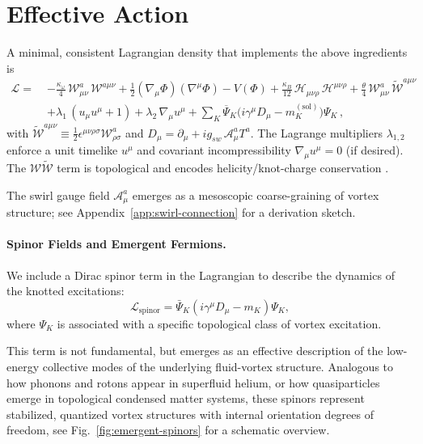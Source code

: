 \documentclass[12pt]{article}
\begin{document}
    \section{Effective Action}

    A minimal, consistent Lagrangian density that implements the above ingredients is
    \begin{align}
        \mathcal{L} =\;& -\frac{\kappa_\omega}{4}\, \mathcal{W}^a_{\mu\nu}\,\mathcal{W}^{a\mu\nu}
        + \frac{1}{2} (\nabla_\mu \Phi)(\nabla^\mu \Phi) - V(\Phi)
        + \frac{\kappa_B}{12}\, \mathcal{H}_{\mu\nu\rho}\,\mathcal{H}^{\mu\nu\rho}
        + \frac{\theta}{4}\, \mathcal{W}^a_{\mu\nu}\,\tilde{\mathcal{W}}^{a\mu\nu} \\
        &+ \lambda_1\,(u_\mu u^\mu + 1) + \lambda_2\, \nabla_\mu u^\mu
        + \sum_K \overline{\Psi}_K\big(i\gamma^\mu D_\mu - m_K^{(\mathrm{sol})}\big)\Psi_K\,,
        \label{eq:EFT}
    \end{align}
    with $\tilde{\mathcal{W}}^{a\mu\nu} \equiv \tfrac{1}{2} \epsilon^{\mu\nu\rho\sigma} \mathcal{W}^a_{\rho\sigma}$ and $D_\mu = \partial_\mu + i g_{\!sw}\,\mathcal{A}_\mu^a T^a$. The Lagrange multipliers $\lambda_{1,2}$ enforce a unit timelike $u^\mu$ and covariant incompressibility $\nabla_\mu u^\mu=0$ (if desired). The $\mathcal{W}\tilde{\mathcal{W}}$ term is topological and encodes helicity/knot-charge conservation \cite{Moffatt1969,Arnold1998}.

    The swirl gauge field \( \mathcal{A}_\mu^a \) emerges as a mesoscopic coarse-graining of vortex structure; see Appendix~\ref{app:swirl-connection} for a derivation sketch.

    \paragraph{Spinor Fields and Emergent Fermions.}
    We include a Dirac spinor term in the Lagrangian to describe the dynamics of the knotted excitations:
    \begin{equation}
        \mathcal{L}_\text{spinor} = \bar{\Psi}_K \left( i\gamma^\mu D_\mu - m_K \right) \Psi_K,
    \end{equation}
    where $\Psi_K$ is associated with a specific topological class of vortex excitation.

    This term is not fundamental, but emerges as an effective description of the low-energy collective modes of the underlying fluid-vortex structure. Analogous to how phonons and rotons appear in superfluid helium, or how quasiparticles emerge in topological condensed matter systems, these spinors represent stabilized, quantized vortex structures with internal orientation degrees of freedom, see Fig.~\ref{fig:emergent-spinors} for a schematic overview.
\end{document}
